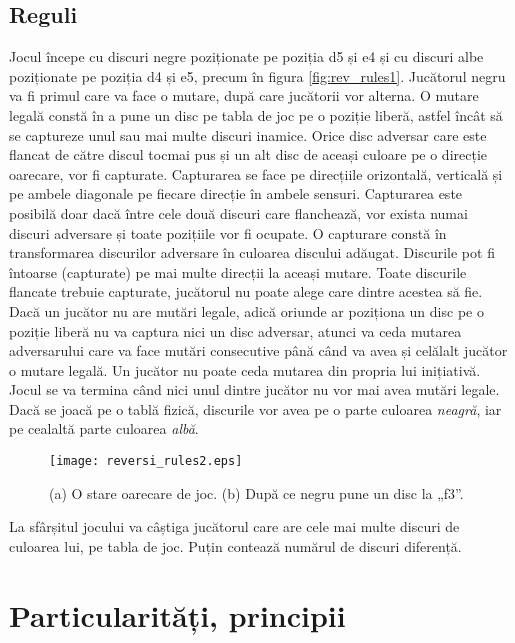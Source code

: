 \documentclass[12pt,twoside,a4paper,fleqn]{book}
\theoremstyle{definition}
\begin{document}
\subsection{Reguli}
\label{reguliOthello}
Jocul începe cu discuri negre poziționate pe poziția d5 și e4 și cu discuri albe poziționate pe poziția d4 și e5, precum în figura \ref{fig:rev_rules1}. Jucătorul negru va fi primul care va face o mutare, după care jucătorii vor alterna. O mutare legală constă în a pune un disc pe tabla de joc pe o poziție liberă, astfel încât să se captureze unul sau mai multe discuri inamice. Orice disc adversar care este flancat de către discul tocmai pus și un alt disc de aceași culoare pe o direcție oarecare, vor fi capturate. Capturarea se face pe direcțiile orizontală, verticală și pe ambele diagonale pe fiecare direcție în ambele sensuri. Capturarea este posibilă doar dacă între cele două discuri care flanchează, vor exista numai discuri adversare și toate pozițiile vor fi ocupate. O capturare constă în transformarea discurilor adversare în culoarea discului adăugat. Discurile pot fi întoarse (capturate) pe mai multe direcții la aceași mutare. Toate discurile flancate trebuie capturate, jucătorul nu poate alege care dintre acestea să fie. Dacă un jucător nu are mutări legale, adică oriunde ar poziționa un disc pe o poziție liberă nu va captura nici un disc adversar, atunci va ceda mutarea adversarului care va face mutări consecutive până când va avea și celălalt jucător o mutare legală. Un jucător nu poate ceda mutarea din propria lui inițiativă. Jocul se va termina când nici unul dintre jucător nu vor mai avea mutări legale.\\
Dacă se joacă pe o tablă fizică, discurile vor avea pe o parte culoarea \emph{neagră}, iar pe cealaltă parte culoarea \emph{albă}. \cite{othello_fang, othello_master}\\

\begin{figure}[h]
\begin{center}
\texttt{[image: reversi\_rules2.eps]}
\caption{\small{(a) O stare oarecare de joc. (b) După ce negru pune un disc la „f3”.}}
\label{fig:rev_rules2}
\end{center}
\end{figure}

La sfârșitul jocului va câștiga jucătorul care are cele mai multe discuri de culoarea lui, pe tabla de joc. Puțin contează numărul de discuri diferență.

\section{Particularități, principii}
\end{document}
